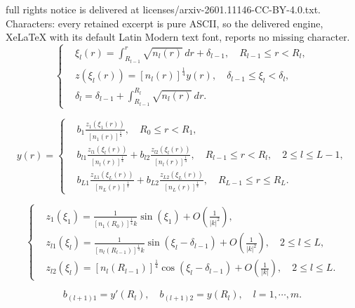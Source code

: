 \documentclass[10pt,a4paper]{amsart}
\begin{document}
full rights notice is delivered at licenses/arxiv-2601.11146-CC-BY-4.0.txt. Characters: every retained excerpt is pure ASCII, so the delivered engine, XeLaTeX with its default Latin Modern text font, reports no missing character.
\begin{equation}\label{eq:Liouville transform}
	\left\{
	\begin{aligned}
		&\xi_l(r) = \int_{R_{l-1}}^r \sqrt{n_l(r)}\,dr+\delta_{l-1} , \quad R_{l-1} \leq r < R_l,\\
		&z(\xi_l(r)) = [n_l(r)]^{\frac{1}{4}} y(r), \quad \delta_{l-1} \leq \xi_l < \delta_l,\\
		&\delta_l = \delta_{l-1} + \int_{R_{l-1}}^{R_l} \sqrt{n_l(r)} \, dr.
	\end{aligned}
	\right.
\end{equation}

\begin{equation}\label{eq:original_ode_solution_y}
	y(r) =
	\left\{
	\begin{aligned}
		&b_1 \frac{z_1(\xi_1(r))}{[n_{1}(r)]^{\frac{1}{4}}}, \quad R_0 \leq r< R_1, \\
		&b_{l1} \frac{z_{l1}(\xi_l(r))}{[n_l(r)]^{\frac{1}{4}}} +b_{l2}\frac{z_{l2}(\xi_l(r))}{[n_l(r)]^{\frac{1}{4}}},  \quad R_{l-1} \leq r<R_l, \quad 2 \leq l \leq L-1, \\
		&b_{L1} \frac{z_{L1}(\xi_L(r))}{[n_L(r)]^{\frac{1}{4}}} +b_{L2}\frac{z_{L2}(\xi_L(r))}{[n_L(r)]^{\frac{1}{4}}},  \quad R_{L-1} \leq r \leq R_L.
	\end{aligned}
	\right.
\end{equation}

\begin{equation}\label{eq:z1z2 dom}	
	\left\{
	\begin{aligned}
		&z_1(\xi_1)= \frac{1}{[n_{1}(R_{0})]^{\frac{1}{4}}k}\sin{(\xi_1)}+O\left(\frac{1}{|k|^2}\right),\\
		&z_{l1}(\xi_l)= \frac{1}{[n_{l}(R_{l-1})]^{\frac{1}{4}}k}\sin{(\xi_{l}-\delta_{l-1})}+O\left(\frac{1}{|k|^2}\right), \quad 2 \leq l \leq L, \\
		&z_{l2}(\xi_l)= [n_{l}(R_{l-1})]^{\frac{1}{4}}\cos{(\xi_{l}-\delta_{l-1})}+O\left(\frac{1}{|k|}\right), \quad 2 \leq l \leq L.
	\end{aligned}
	\right.
\end{equation}

\begin{equation}\label{eq:b_l+11_b_l+12}
	b_{(l+1)1}=y'(R_l), \quad b_{(l+1)2}=y(R_l), \quad l=1,\cdots,m.
\end{equation}
\end{document}
